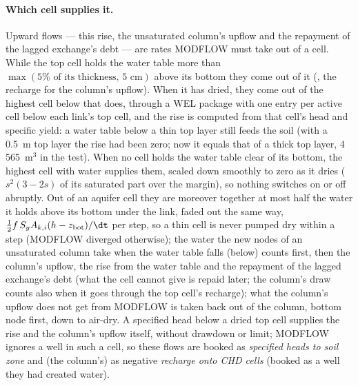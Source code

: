 \paragraph{Which cell supplies it.} Upward flows --- this rise, the unsaturated column's upflow and the repayment of
the lagged exchange's debt --- are rates MODFLOW must take out of a cell. While the top cell holds the water table more
than $\max(5\%\text{ of its thickness},\,5\text{ cm})$ above its bottom they come out of it (, the
recharge for the column's upflow). When it has dried, they come out of the highest cell below that does, through a WEL
package  with one entry per active cell below each link's top cell, and the rise is computed from that
cell's head and specific yield: a water table below a thin top layer still feeds the soil (with a 0.5~m
top layer the rise had been zero; now it equals that of a thick top layer, 4\,565~m$^3$ in the test). When no cell holds
the water table clear of its bottom, the highest cell with water supplies them, scaled down smoothly to zero as it dries
($s^2(3-2s)$ of its saturated part over the margin), so nothing switches on or off abruptly. Out of an aquifer cell they
are moreover together at most half the water it holds above its bottom under the link, faded out the same way,
$\tfrac12 f\,S_yA_{k,i}(h-z_{\mathrm{bot}})/\dt$ per step, so a thin cell is never pumped dry within a step (MODFLOW diverged otherwise); the water the new nodes of an unsaturated column take when the water table falls
(below) counts first, then the column's upflow, the rise from the water table and the repayment of the lagged
exchange's debt (what the cell cannot give is repaid later; the column's draw counts also when it goes through the top
cell's recharge); what the column's
upflow does not get from MODFLOW is taken back out of the column, bottom node first, down to air-dry. A specified head
below a dried top cell supplies the rise and the column's upflow itself, without drawdown or limit; MODFLOW ignores a
well in such a cell, so these flows are booked as \emph{specified heads to soil zone} and (the column's) as negative
\emph{recharge onto CHD cells} (booked as a well they had created water).

